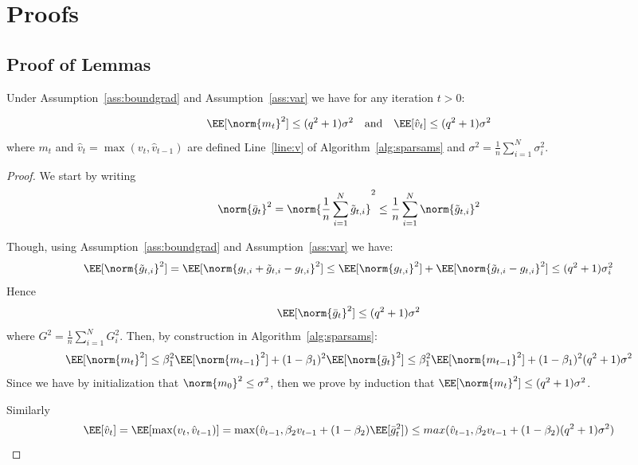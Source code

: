 \documentclass[11pt]{article}
\begin{document}
\section{Proofs}\label{app:proofs}


\subsection{Proof of Lemmas}

\begin{Lemma*}
Under Assumption~\ref{ass:boundgrad} and Assumption~\ref{ass:var} we have for any iteration $t >0$:

\begin{equation}
\EE[\norm{m_t}^2] \leq (q^2+1) \sigma^2 \quad \textrm{and} \quad \EE[\hat v_t] \leq (q^2+1) \sigma^2
\end{equation}
where $m_t$ and $\hat v_t=\max(v_t,\hat v_{t-1})$ are defined Line~\ref{line:v} of Algorithm~\ref{alg:sparsams} and $\sigma^2 = \frac{1}{n}\sum_{i=1}^N  \sigma_i^2$.
\end{Lemma*}

\begin{proof}
We start by writing
\begin{equation}
\norm{\bar g_t}^2  = \norm{\frac{1}{n}\sum_{i=1}^N \tilde g_{t,i} }^2 \leq \frac{1}{n}\sum_{i=1}^N \norm{\tilde g_{t,i} }^2
\end{equation}

Though, using Assumption~\ref{ass:boundgrad} and Assumption~\ref{ass:var} we have:
\begin{equation}
\EE[\norm{\tilde g_{t,i} }^2]  = \EE[\norm{g_{t,i}  + \tilde g_{t,i}  - g_{t,i}}^2] \leq \EE[\norm{g_{t,i} }^2] + \EE[\norm{\tilde g_{t,i}  - g_{t,i}}^2] \leq (q^2+1)\sigma_i^2
\end{equation}
Hence
\begin{equation}
\EE[\norm{\bar g_t}^2]  \leq (q^2+1) \sigma^2
\end{equation}
where $G^2 = \frac{1}{n}\sum_{i=1}^N  G_{i}^2$.
Then, by construction in Algorithm~\ref{alg:sparsams}:
\begin{equation}
\EE[\norm{m_t}^2]  \leq \beta_1^2 \EE[\norm{m_{t-1}}^2] + (1 - \beta_1)^2 \EE[\norm{\bar g_t}^2]  \leq \beta_1^2\EE[ \norm{m_{t-1}}^2] + (1 - \beta_1)^2(q^2+1) \sigma^2
\end{equation}
Since we have by initialization that $\norm{m_0}^2 \leq \sigma^2$, then we prove by induction that $\EE[\norm{m_t}^2] \leq (q^2+1) \sigma^2$.

Similarly
\begin{equation}
\EE[\hat v_t] = \EE[\max(v_t,\hat v_{t-1})] = \max(\hat v_{t-1}, \beta_2 v_{t-1}+(1-\beta_2)\EE[\bar g_t^2]) \leq  max(\hat v_{t-1}, \beta_2 v_{t-1}+(1-\beta_2)(q^2+1) \sigma^2) 
\end{equation}
\end{proof}
\end{document}
